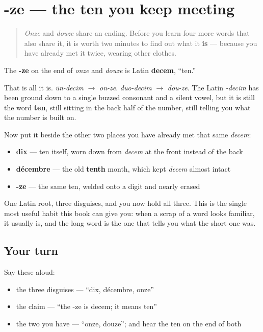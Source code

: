 \section[-ze]{-ze — the ten you keep meeting}

\label{lesson:FR-C12-ze-decem}



\begin{quote}
\emph{Onze} and \emph{douze} share an ending. Before you learn four more words that also share it, it is worth two minutes to find out what it \textbf{is} — because you have already met it twice, wearing other clothes.
\end{quote}

\begin{cousinweb}
The \textbf{-ze} on the end of \emph{onze} and \emph{douze} is Latin \textbf{decem}, \textquotedblleft{}ten.\textquotedblright{}

That is all it is. \emph{ūn-decim} $\to$ \emph{on-ze}. \emph{duo-decim} $\to$ \emph{dou-ze}. The Latin \emph{-decim} has been ground down to a single buzzed consonant and a silent vowel, but it is still the word \textbf{ten}, still sitting in the back half of the number, still telling you what the number is built on.

Now put it beside the other two places you have already met that same \emph{decem}:

\begin{itemize}
\raggedright
  \item \textbf{dix} — ten itself, worn down from \emph{decem} at the front instead of the back
  \item \textbf{décembre} — the old \textbf{tenth} month, which kept \emph{decem} almost intact
  \item \textbf{-ze} — the same ten, welded onto a digit and nearly erased
\end{itemize}

One Latin root, three disguises, and you now hold all three. This is the single most useful habit this book can give you: when a scrap of a word looks familiar, it usually is, and the long word is the one that tells you what the short one was.
\end{cousinweb}

\subsection*{Your turn}
Say these aloud:

\begin{itemize}
\raggedright
  \item the three disguises — \textquotedblleft{}dix, décembre, onze\textquotedblright{}
  \item the claim — \textquotedblleft{}the -ze is decem; it means ten\textquotedblright{}
  \item the two you have — \textquotedblleft{}onze, douze\textquotedblright{}; and hear the ten on the end of both
\end{itemize}

